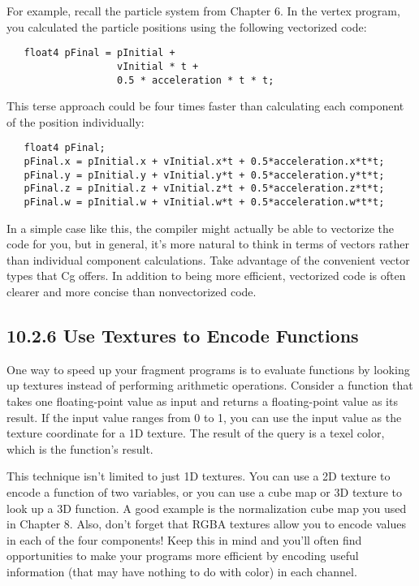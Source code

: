 \documentclass[../main.tex]{subfiles}
\begin{document}
For example, recall the particle system from Chapter 6. In the vertex program, you calculated the particle positions using the following vectorized code:

\FloatBarrier
\begin{lstlisting}
   float4 pFinal = pInitial +
                   vInitial * t +
                   0.5 * acceleration * t * t;
\end{lstlisting}
\FloatBarrier

This terse approach could be four times faster than calculating each component of the position individually:

\FloatBarrier
\begin{lstlisting}
   float4 pFinal;
   pFinal.x = pInitial.x + vInitial.x*t + 0.5*acceleration.x*t*t;
   pFinal.y = pInitial.y + vInitial.y*t + 0.5*acceleration.y*t*t;
   pFinal.z = pInitial.z + vInitial.z*t + 0.5*acceleration.z*t*t;
   pFinal.w = pInitial.w + vInitial.w*t + 0.5*acceleration.w*t*t;
\end{lstlisting}
\FloatBarrier

In a simple case like this, the compiler might actually be able to vectorize the code for you, but in general, it's more natural to think in terms of vectors rather than individual component calculations. Take advantage of the convenient vector types that Cg offers. In addition to being more efficient, vectorized code is often clearer and more concise than nonvectorized code.

\subsection{10.2.6 Use Textures to Encode Functions}

One way to speed up your fragment programs is to evaluate functions by looking up textures instead of performing arithmetic operations. Consider a function that takes one floating-point value as input and returns a floating-point value as its result. If the input value ranges from 0 to 1, you can use the input value as the texture coordinate for a 1D texture. The result of the query is a texel color, which is the function's result.

This technique isn't limited to just 1D textures. You can use a 2D texture to encode a function of two variables, or you can use a cube map or 3D texture to look up a 3D function. A good example is the normalization cube map you used in Chapter 8. Also, don't forget that RGBA textures allow you to encode values in each of the four components! Keep this in mind and you'll often find opportunities to make your programs more efficient by encoding useful information (that may have nothing to do with color) in each channel.
\end{document}
